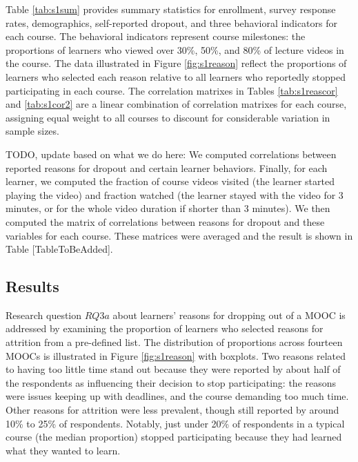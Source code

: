 \documentclass{sigchi}\usepackage[]{graphicx}\usepackage[]{color}
\begin{document}
Table \ref{tab:s1sum} provides summary statistics for enrollment, survey response rates, demographics, self-reported dropout, and three behavioral indicators for each course. The behavioral indicators represent course milestones: the proportions of learners who viewed over 30\%, 50\%, and 80\% of lecture videos in the course. The data illustrated in Figure \ref{fig:s1reason} reflect the proportions of learners who selected each reason relative to all learners who reportedly stopped participating in each course. The correlation matrixes in Tables \ref{tab:s1reascor} and \ref{tab:s1cor2} are a linear combination of correlation matrixes for each course, assigning equal weight to all courses to discount for considerable variation in sample sizes.

TODO, update based on what we do here: We computed correlations between reported reasons for dropout and certain learner behaviors. Finally, for each learner, we computed the fraction of course videos visited (the learner started playing the video) and fraction watched (the learner stayed with the video for 3 minutes, or for the whole video duration if shorter than 3 minutes). We then computed the matrix of correlations between reasons for dropout and these variables for each course. These matrices were averaged and the result is shown in Table [TableToBeAdded].


\subsection{Results}

Research question $RQ3a$ about learners' reasons for dropping out of a MOOC is addressed by examining the proportion of learners who selected reasons for attrition from a pre-defined list. The distribution of proportions across fourteen MOOCs is illustrated in Figure \ref{fig:s1reason} with boxplots. Two reasons related to having too little time stand out because they were reported by about half of the respondents as influencing their decision to stop participating: the reasons were issues keeping up with deadlines, and the course demanding too much time. Other reasons for attrition were less prevalent, though still reported by around 10\% to 25\% of respondents. Notably, just under 20\% of respondents in a typical course (the median proportion) stopped participating because they had learned what they wanted to learn.
\end{document}
